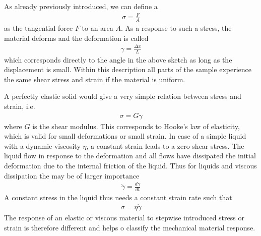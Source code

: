 \documentclass[letterpaper,10pt,english]{sphinxmanual}
\begin{document}
\sphinxAtStartPar
{}

\sphinxAtStartPar
As already previously introduced, we can define a 
\begin{equation*}
\begin{split}\sigma=\frac{F}{A}\end{split}
\end{equation*}
\sphinxAtStartPar
as the tangential force \(F\) to an area \(A\). As a response to such a stress, the material deforms and the deformation is called 
\begin{equation*}
\begin{split}\gamma =\frac{\Delta x}{L}\end{split}
\end{equation*}
\sphinxAtStartPar
which corresponds directly to the angle in the above sketch as long as the displacement is small. Within this description all parts of the sample experience the same shear stress and strain if the material is uniform.

\sphinxAtStartPar
A perfectly elastic solid would give a very simple relation between stress and strain, i.e.
\begin{equation*}
\begin{split}\sigma=G \gamma\end{split}
\end{equation*}
\sphinxAtStartPar
where \(G\) is the shear modulus. This corresponds to Hooke’s law of elasticity, which is valid for small deformations or small strain. In case of a simple liquid with a dynamic viscosity \(\eta\), a constant strain leads to a zero shear stress. The liquid flow in response to the deformation and all flows have dissipated the initial deformation due to the internal friction of the liquid. Thus for liquids and viscous dissipation the  may be of larger importance
\begin{equation*}
\begin{split}\dot{\gamma}=\frac{d\gamma}{dt}\end{split}
\end{equation*}
\sphinxAtStartPar
A constant stress in the liquid thus needs a constant strain rate such that
\begin{equation*}
\begin{split}\sigma=\eta \dot{\gamma} \tag{Newton's law of viscosity}\end{split}
\end{equation*}
\sphinxAtStartPar
The response of an elastic or viscous material to stepwise introduced stress or strain is therefore different and helps o classify the mechanical material response.
\end{document}
